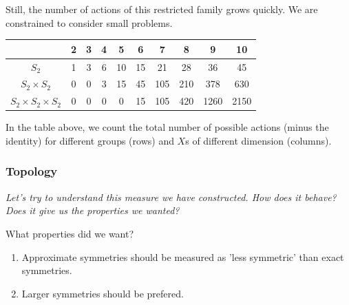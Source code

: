 
Still, the number of actions of this restricted family grows quickly. We are constrained to consider small problems.

\begin{changemargin}{-3cm}{-3cm}
  \begin{center}
    \begin{tabular}{ c || c | c | c | c | c | c | c | c | c }
											        & 2 & 3 & 4 & 5  & 6   & 7   & 8   & 9 & 10 \\ \hline \hline
											  $S_2$ & 1 & 3 & 6 & 10 & 15  & 21  & 28  & 36   & 45\\ \hline
					   $S_2 \times S_2$ & 0 & 0 & 3 & 15 & 45  & 105 & 210 & 378  & 630 \\ \hline
	$S_2 \times S_2 \times S_2$ & 0 & 0 & 0 & 0  & 15  & 105 & 420 & 1260 & 2150 \\
    \end{tabular}
  \end{center}
\end{changemargin}

In the table above, we count the total number of possible actions (minus the identity) for
different groups (rows) and $X$s of different dimension (columns).


\subsubsection{Topology}

\begin{displayquote}
\textsl{Let's try to understand this measure we have constructed. How does it behave?
Does it give us the properties we wanted?}
\end{displayquote}

What properties did we want?

\begin{enumerate}
\tightlist
	\item Approximate symmetries should be measured as 'less symmetric' than exact symmetries.
	\item Larger symmetries should be prefered.
\end{enumerate}

